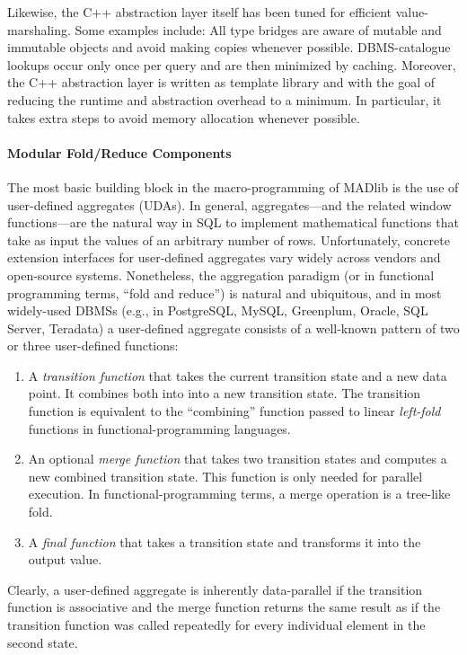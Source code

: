 Likewise, the C++ abstraction layer itself has been tuned for efficient value-marshaling. Some examples include: All type bridges are aware of mutable and immutable objects and avoid making copies whenever possible. DBMS-catalogue lookups occur only once per query and are then minimized by caching. Moreover, the C++ abstraction layer is written as template library and with the goal of reducing the runtime and abstraction overhead to a minimum. In particular, it takes extra steps to avoid memory allocation whenever possible.

\paragraph{Modular Fold/Reduce Components}

The most basic building block in the macro-programming of MADlib is the use of user-defined aggregates (UDAs). In general, aggregates---and the related window functions---are the natural way in SQL to implement mathematical functions that take as input the values of an arbitrary number of rows. Unfortunately, concrete extension interfaces for user-defined aggregates vary widely across vendors and open-source systems. Nonetheless, the aggregation paradigm (or in functional programming terms, ``fold and reduce'') is natural and ubiquitous, and in most widely-used DBMSs (e.g., in PostgreSQL, MySQL, Greenplum, Oracle, SQL Server, Teradata) a user-defined aggregate consists of a well-known pattern of two or three user-defined functions:
\begin{enumerate}
	\item A \emph{transition function} that takes the current transition state and a new data point. It combines both into into a new transition state. The transition function is equivalent to the ``combining'' function passed to linear \emph{left-fold} functions in functional-programming languages.
	\item An optional \emph{merge function} that takes two transition states and computes a new combined transition state. This function is only needed for parallel execution. In functional-programming terms, a merge operation is a tree-like fold.
	\item A \emph{final function} that takes a transition state and transforms it into the output value.
\end{enumerate}
Clearly, a user-defined aggregate is inherently data-parallel if the transition function is associative and the merge function returns the same result as if the transition function was called repeatedly for every individual element in the second state.

